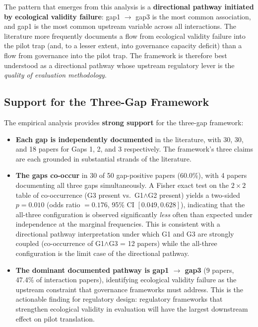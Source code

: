 The pattern that emerges from this analysis is a
\textbf{directional pathway initiated by ecological validity
failure}: gap1 $\rightarrow$ gap3 is the most common association,
and gap1 is the most common upstream variable across all
interactions. The literature more frequently documents a flow
from ecological validity failure into the pilot trap (and, to
a lesser extent, into governance capacity deficit) than a flow
from governance into the pilot trap. The framework is
therefore best understood as a directional pathway whose upstream
regulatory lever is the \textit{quality of evaluation
methodology}.

\subsection{Support for the Three-Gap Framework}

The empirical analysis provides \textbf{strong support} for the
three-gap framework:

\begin{itemize}
  \item \textbf{Each gap is independently documented} in the
        literature, with 30, 30, and 18 papers for Gaps 1, 2,
        and 3 respectively. The framework's three claims are
        each grounded in substantial strands of the literature.

  \item \textbf{The gaps co-occur} in 30 of 50 gap-positive
        papers (60.0\%), with 4 papers documenting all three
        gaps simultaneously. A Fisher exact test on the
        $2 \times 2$ table of co-occurrence (G3 present vs.\
        G1$\wedge$G2 present) yields a two-sided $p = 0.010$
        (odds ratio $= 0.176$, 95\% CI $[0.049, 0.628]$),
        indicating that the all-three configuration is
        observed significantly \emph{less} often than expected
        under independence at the marginal frequencies. This
        is consistent with a directional pathway interpretation under
        which G1 and G3 are strongly coupled (co-occurrence of
        G1$\wedge$G3 = 12 papers) while the all-three
        configuration is the limit case of the directional pathway.

  \item \textbf{The dominant documented pathway is gap1
        $\rightarrow$ gap3} (9 papers, 47.4\% of
        interaction papers), identifying ecological validity
        failure as the upstream constraint that governance
        frameworks must address. This is the actionable
        finding for regulatory design: regulatory frameworks
        that strengthen ecological validity in evaluation
        will have the largest downstream effect on pilot
        translation.
\end{itemize}

